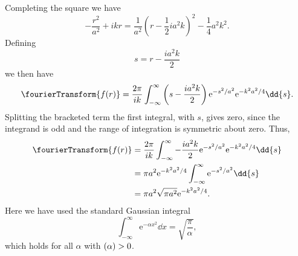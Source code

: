 \documentclass[fleqn]{NotesClass}
\newcommand*{\e}{\mathrm{e}}
\let\Re\relax
\DeclareMathOperator{\Re}{Re}
\begin{document}
    Completing the square we have
    \begin{equation}
        -\frac{r^2}{a^2} + ikr = \frac{1}{a^2}\left( r - \frac{1}{2}ia^2k \right)^2 -\frac{1}{4}a^2k^2.
    \end{equation}
    Defining
    \begin{equation}
        s = r - \frac{ia^2k}{2}
    \end{equation}
    we then have
    \begin{equation}
        \fourierTransform\{f(r)\} = \frac{2\pi}{ik} \int_{-\infty}^{\infty} \left( s - \frac{ia^2k}{2} \right) \e^{-s^2/a^2}\e^{-k^2a^2/4} \dd{s}.
    \end{equation}
    Splitting the bracketed term the first integral, with \(s\), gives zero, since the integrand is odd and the range of integration is symmetric about zero.
    Thus,
    \begin{align}
        \fourierTransform\{f(r)\} &= \frac{2\pi}{ik} \int_{-\infty}^{\infty} -\frac{ia^2k}{2} \e^{-s^2/a^2}\e^{-k^2a^2/4} \dd{s}\\
        &= \pi a^2\e^{-k^2a^2/4} \int_{-\infty}^{\infty} \e^{-s^2/a^2} \dd{s}\\
        &= \pi a^2 \sqrt{\pi a^2} \e^{-k^2a^2/4}.
    \end{align}
    Here we have used the standard Gaussian integral
    \begin{equation}
        \int_{-\infty}^{\infty} \e^{-\alpha x^2} \dd{x} = \sqrt{\frac{\pi}{\alpha}},
    \end{equation}
    which holds for all \(\alpha\) with \(\Re(\alpha) > 0\).
    
\end{document}
